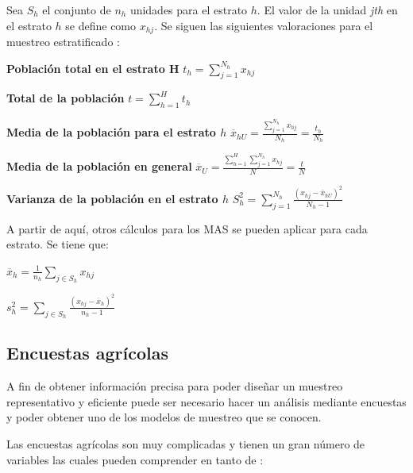 \documentclass{report}
\begin{document}
Sea $S_h$ el conjunto de $n_h$ unidades para el estrato $h$. El valor de la unidad \textit{jth} en el estrato $h$ se define como $x_{hj}$. Se siguen las siguientes valoraciones para el muestreo estratificado \cite{lohr-2009}:

\bigbreak

\textbf{Población total en el estrato H}
\bigbreak
$t_h = \sum_{j=1}^{N_h} x_{hj}$


\bigbreak

\textbf{Total de la población}
\bigbreak
$t = \sum_{h=1}^H t_h$


\bigbreak

\textbf{Media de la población para el estrato $h$}
\bigbreak
$\overline{x}_{hU} = \frac{\sum_{j=1}^{N_h} x_{hj}}{N_h} = \frac{t_h}{N_h}$


\bigbreak

\textbf{Media de la población en general}
\bigbreak
$\overline{x}_U = \frac{\sum_{h=1}^H \sum_{j=1}^{N_h} x_{hj}}{N} = \frac{t}{N}$


\bigbreak

\textbf{Varianza de la población en el estrato $h$}
\bigbreak
$S_h^2 = \sum_{j=1}^{N_h} \frac{(x_{hj} - \overline{x}_{hU})^2}{N_h - 1}$


\bigbreak

A partir de aquí, otros cálculos para los MAS se pueden aplicar para cada estrato. Se tiene que:

\bigbreak

$\overline{x}_h = \frac{1}{n_h} \sum_{j \in S_h} x_{hj}$

\bigbreak

$s^2_h = \sum_{j \in S_h} \frac{(x_{hj} - \overline{x}_h)^2}{n_h - 1}$

\subsection{Encuestas agrícolas}

A fin de obtener información precisa para poder diseñar un muestreo representativo y eficiente puede ser necesario hacer un análisis mediante encuestas y poder obtener uno de los modelos de muestreo que se conocen.

\bigbreak

Las encuestas agrícolas son muy complicadas y tienen un gran número de variables las cuales pueden comprender en tanto de \cite{organizacion-de-las-naciones-unidas-para-la-agricultura-y-la-alimentacion-1990}:
\end{document}
